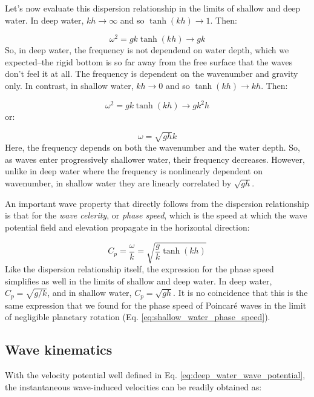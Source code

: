 \documentclass[12pt]{article}
\numberwithin{equation}{section}
\numberwithin{figure}{section}
\numberwithin{table}{section}
\begin{document}
Let's now evaluate this dispersion relationship in the limits of shallow and
deep water.
In deep water, $kh \to \infty$ and so $\tanh(kh) \to 1$.
Then:

\begin{equation}
  \omega^2 = g k \tanh(kh) \to g k
\end{equation}
So, in deep water, the frequency is not dependend on water depth, which we
expected--the rigid bottom is so far away from the free surface that the waves
don't feel it at all.
The frequency is dependent on the wavenumber and gravity only.
In contrast, in shallow water, $kh \to 0$ and so $\tanh(kh) \to kh$.
Then:

\begin{equation}
  \omega^2 = g k \tanh(kh) \to g k^2 h
\end{equation}
or:

\begin{equation}
  \omega = \sqrt{g h} k
\end{equation}
Here, the frequency depends on both the wavenumber and the water depth.
So, as waves enter progressively shallower water, their frequency decreases.
However, unlike in deep water where the frequency is nonlinearly dependent on
wavenumber, in shallow water they are linearly correlated by $\sqrt{g h}$.

An important wave property that directly follows from the dispersion
relationship is that for the \textit{wave celerity},
or \textit{phase speed}, which is the speed at which the wave potential field
and elevation propagate in the horizontal direction:

\begin{equation}
  C_p = \frac{\omega}{k} = \sqrt{\frac{g}{k} \tanh(kh)}
\end{equation}
Like the dispersion relationship itself, the expression for the phase speed
simplifies as well in the limits of shallow and deep water.
In deep water, $C_p = \sqrt{g/k}$, and in shallow water, $C_p = \sqrt{g h}$.
It is no coincidence that this is the same expression that we found for the
phase speed of Poincaré waves in the limit of negligible planetary rotation
(Eq. \ref{eq:shallow_water_phase_speed}).

\subsection{Wave kinematics}

With the velocity potential well defined in Eq. \ref{eq:deep_water_wave_potential},
the instantaneous wave-induced velocities can be readily obtained as:
\end{document}
